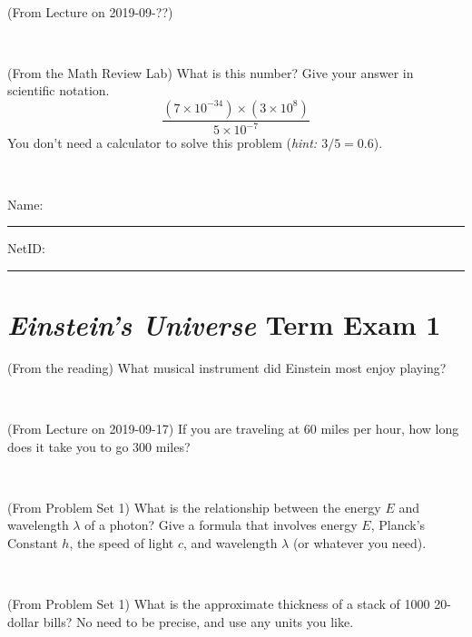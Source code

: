 \documentclass[12pt, letterpaper]{article}
\begin{document}
\vfill ~

\begin{problem} (From Lecture on 2019-09-??)
\end{problem}


\vfill ~

\begin{problem} (From the Math Review Lab)
What is this number? Give your answer in scientific notation.
$$
\frac{(7\times10^{-34})\times(3\times10^8)}{5\times10^{-7}}
$$
You don't need a calculator to solve this problem (\textit{hint: $3/5=0.6$}).
\end{problem}


\vfill ~


\cleardoublepage



\noindent
Name: \rule[-1ex]{0.60\textwidth}{0.1pt}
NetID: \rule[-1ex]{0.20\textwidth}{0.1pt}

\section*{\textsl{Einstein's Universe} Term Exam 1}
\setcounter{problem}{1}


\begin{problem} (From the reading)
What musical instrument did Einstein most enjoy playing?
\end{problem}


\vfill ~

\begin{problem} (From Lecture on 2019-09-17)
If you are traveling at 60 miles per hour, how long does
it take you to go 300 miles?
\end{problem}


\vfill ~

\begin{problem} (From Problem Set 1)
What is the relationship between the energy $E$ and wavelength
$\lambda$ of a photon? Give a formula that involves energy $E$,
Planck's Constant $h$, the speed of light $c$, and wavelength
$\lambda$ (or whatever you need).
\end{problem}

\vfill ~

\begin{problem} (From Problem Set 1)
What is the approximate thickness of a stack of 1000 20-dollar bills?
No need to be precise, and use any units you like.
\end{problem}


\vfill ~
\end{document}
